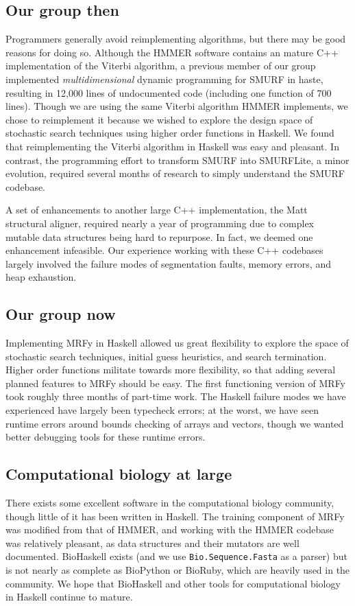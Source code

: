 \documentclass[preprint,nonatbib,blockstyle,nocopyrightspace,times]{sigplanconf}
\let\cite\citep
\begin{document}
\subsection{Our group then}
Programmers generally avoid reimplementing algorithms, but there may be good reasons for doing so.
Although the HMMER software contains an mature C++ implementation of the Viterbi algorithm,
a previous member of our group implemented \textit{multidimensional} dynamic programming for SMURF
in haste, resulting in 12,000 lines of undocumented code (including one function of 700 lines).
Though we are using the same Viterbi algorithm HMMER implements, we chose to reimplement it because
we wished to explore the design space of stochastic search techniques using higher order functions
in Haskell.
We found that reimplementing the Viterbi algorithm in Haskell was easy and pleasant.
In contrast, the programming effort to transform SMURF into SMURFLite, a minor evolution, required
several months of research to simply understand the SMURF codebase.

A set of enhancements to another large C++ implementation, the Matt~\cite{Menke:2008wu} structural
aligner, required nearly a year of programming due to complex mutable data structures being 
hard to repurpose.
In fact, we deemed one enhancement infeasible.
Our experience working with these C++ codebases largely involved the failure modes of
segmentation faults, memory errors, and heap exhaustion.

\subsection{Our group now}
Implementing MRFy in Haskell allowed us great flexibility to explore the space of stochastic search
techniques, initial guess heuristics, and search termination.
Higher order functions militate towards more flexibility, so that adding several planned features 
to MRFy should be easy.
The first functioning version of MRFy took roughly three months of part-time work.
The Haskell failure modes we have experienced have largely been typecheck errors; at the worst,
we have seen runtime errors around bounds checking of arrays and vectors, though we wanted
better debugging tools for these runtime errors.

\subsection{Computational biology at large}
There exists some excellent software in the computational biology community, though little of it
has been written in Haskell.
The training component of MRFy was modified from that of HMMER, and working with the HMMER
codebase was relatively pleasant, as data structures and their mutators are well documented.
BioHaskell exists (and we use \texttt{Bio.Sequence.Fasta} as a parser) but is not nearly as
complete as BioPython or BioRuby, which are heavily used in the community.
We hope that BioHaskell and other tools for computational biology in Haskell continue to mature.
\end{document}
